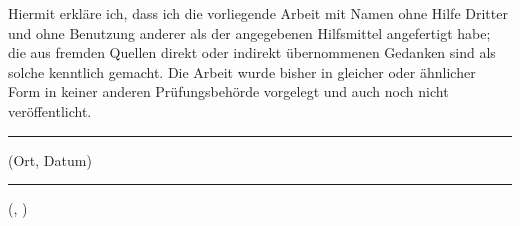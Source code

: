 Hiermit erkläre ich, dass ich die vorliegende Arbeit mit Namen \textbf{\textit{\titel}} ohne Hilfe Dritter und ohne Benutzung anderer als der angegebenen Hilfsmittel angefertigt habe; die aus fremden Quellen direkt oder indirekt übernommenen Gedanken sind als solche kenntlich gemacht. Die Arbeit wurde bisher in gleicher oder ähnlicher Form in keiner anderen Prüfungsbehörde vorgelegt und auch noch nicht veröffentlicht.

\vspace{5cm}

\parbox{7cm}{\hrule
\strut \centering\footnotesize (Ort, Datum)} \hfill\parbox{7cm}{\hrule
\strut \centering\footnotesize (\autor, \mtrnr)}
